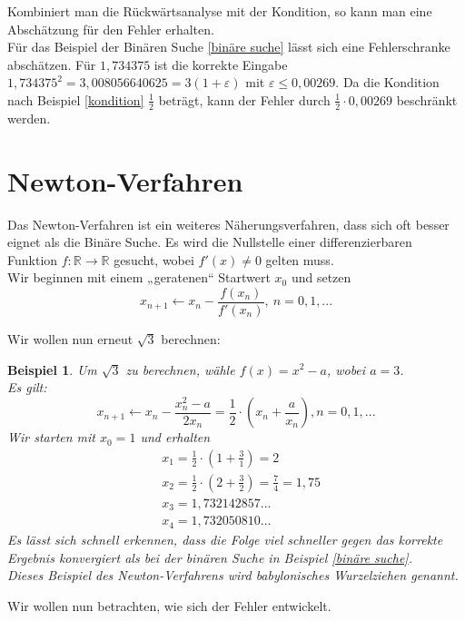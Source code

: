 \documentclass[12pt]{article}
\newcommand{\R}{\mathbb{R}} %
\newtheorem{beispiel}[satz]{Beispiel}
\begin{document}
\noindent Kombiniert man die Rückwärtsanalyse mit der Kondition, so kann man eine Abschätzung für den Fehler erhalten. \\ 
Für das Beispiel der Binären Suche \ref{binäre suche} lässt sich eine Fehlerschranke abschätzen. Für $1,734375$ ist die korrekte Eingabe $1,734375^2=3,008056640625=3(1+\varepsilon)$ mit $\varepsilon \leq 0,00269$. Da die Kondition nach Beispiel \ref{kondition} $\frac{1}{2}$ beträgt, kann der Fehler durch $\frac{1}{2}\cdot 0,00269$ beschränkt werden.

\newpage
\section{Newton-Verfahren}
Das Newton-Verfahren ist ein weiteres Näherungsverfahren, dass sich oft besser eignet als die Binäre Suche. Es wird die Nullstelle einer differenzierbaren Funktion $f: \R \to \R$ gesucht, wobei $f'(x) \neq0$ gelten muss. \\ 
Wir beginnen mit einem „geratenen“ Startwert $x_0$ und setzen
\begin{equation*}
    x_{n+1} \leftarrow x_n - \frac{f(x_n)}{f'(x_n)}, \: n=0,1,...
\end{equation*}

\noindent Wir wollen nun erneut $\sqrt{3}$ berechnen:

\begin{beispiel}
    Um $\sqrt{3}$ zu berechnen, wähle $f(x)= x^2-a$, wobei $a=3$. \\
    Es gilt: 
    \begin{equation*}
        x_{n+1} \leftarrow x_n - \frac{x_n^2-a}{2x_n}= \frac{1}{2} \cdot \left(x_n+ \frac{a}{x_n}\right), n=0,1,...
    \end{equation*}
    Wir starten mit $x_0=1$ und erhalten
    \begin{align*}
        &x_1= \frac{1}{2} \cdot \left( 1+\frac{3}{1}\right)=2 \\
        &x_2= \frac{1}{2} \cdot \left( 2+ \frac{3}{2} \right)= \frac{7}{4}=1,75 \\
        &x_3= 1,732142857... \\
        &x_4= 1,732050810...
    \end{align*}
    \noindent Es lässt sich schnell erkennen, dass die Folge viel schneller gegen das korrekte Ergebnis konvergiert als bei der binären Suche in Beispiel \ref{binäre suche}. \\
    Dieses Beispiel des Newton-Verfahrens wird babylonisches Wurzelziehen genannt.
    \label{newton verfahren}
\end{beispiel}
\noindent Wir wollen nun betrachten, wie sich der Fehler entwickelt. 
\end{document}
